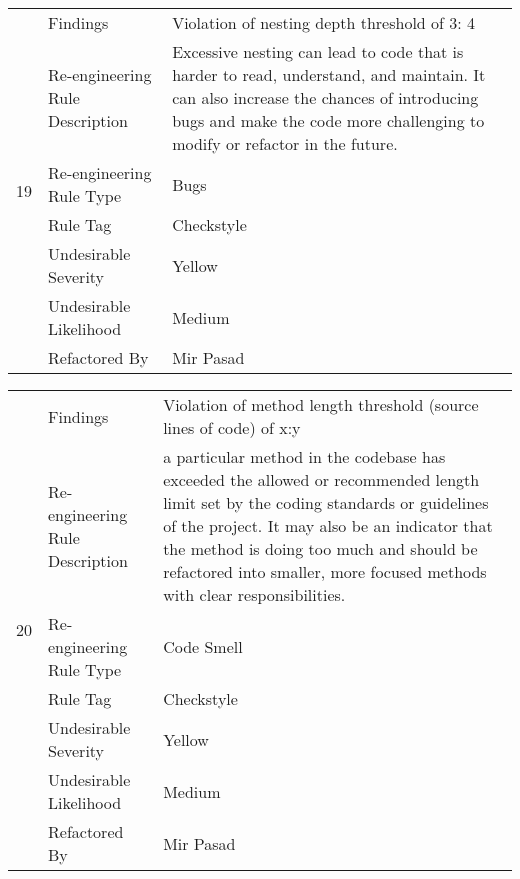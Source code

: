 \documentclass[12pt,english]{article}
\begin{document}
\begin{table}[!ht]
    \begin{tabularx}{\textwidth}{|c|l|X|}
    \hline
        \multirow{7}{*}{19} & Findings & Violation of nesting depth threshold of 3: 4 \\ \cline{2-3}
        & Re-engineering Rule Description & Excessive nesting can lead to code that is harder to read, understand, and maintain. It can also increase the chances of introducing bugs and make the code more challenging to modify or refactor in the future. \\ \cline{2-3}
        & Re-engineering Rule Type & Bugs \\ \cline{2-3}
        & Rule Tag & Checkstyle \\ \cline{2-3}
        & Undesirable Severity & Yellow \\ \cline{2-3}
        & Undesirable Likelihood & Medium \\ \cline{2-3}
        & Refactored By & Mir Pasad \\ \hline
    \end{tabularx}
\end{table}

\begin{table}[!ht]
    \begin{tabularx}{\textwidth}{|c|l|X|}
    \hline
        \multirow{7}{*}{20} & Findings & Violation of method length threshold (source lines of code) of
x:y \\ \cline{2-3}
        & Re-engineering Rule Description & a particular method in the codebase has exceeded the allowed or recommended length limit set by the coding standards or guidelines of the project. It may also be an indicator that the method is doing too much and should be refactored into smaller, more focused methods with clear responsibilities.  \\ \cline{2-3}
        & Re-engineering Rule Type & Code Smell \\ \cline{2-3}
        & Rule Tag & Checkstyle \\ \cline{2-3}
        & Undesirable Severity & Yellow \\ \cline{2-3}
        & Undesirable Likelihood & Medium \\ \cline{2-3}
        & Refactored By & Mir Pasad \\ \hline
    \end{tabularx}
\end{table}
\end{document}
